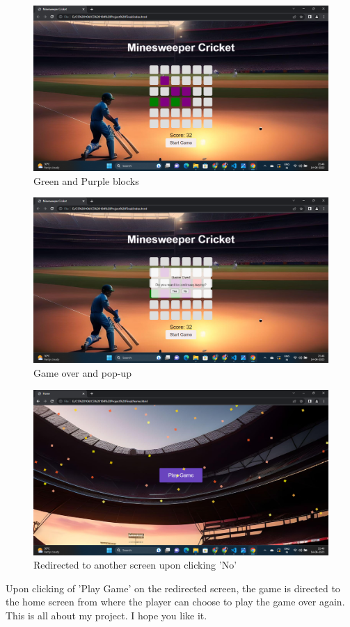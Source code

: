 \documentclass{article}
\begin{document}
\begin{figure}
[H]
   \includegraphics[width=\linewidth]{Screenshot (229).png}
   \caption{Green and Purple blocks}
\end{figure}
\begin{figure}
[H]
   \includegraphics[width=\linewidth]{Screenshot (230).png}
   \caption{Game over and pop-up}
\end{figure}
\begin{figure}
[H]
   \includegraphics[width=\linewidth]{Screenshot (231).png}
   \caption{Redirected to another screen upon clicking 'No'}
\end{figure}
Upon clicking of 'Play Game' on the redirected screen, the game is directed to the home screen from where the player can choose to play the game over again.
This is all about my project. I hope you like it.
\nocite{*}
\printbibliography
\end{document}
